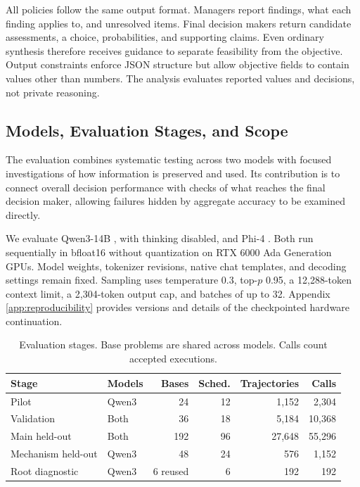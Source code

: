 \documentclass{svproc}
\begin{document}
All policies follow the same output format. Managers report findings, what each
finding applies to, and unresolved items. Final decision makers return candidate
assessments, a choice, probabilities, and supporting claims. Even ordinary
synthesis therefore receives guidance to separate feasibility from the objective.
Output constraints enforce JSON structure but allow objective fields to contain
values other than numbers. The analysis evaluates reported values and decisions,
not private reasoning.



\subsection{Models, Evaluation Stages, and Scope}
The evaluation combines systematic testing across two models with focused
investigations of how information is preserved and used. Its contribution is
to connect overall decision performance with checks of what reaches the final
decision maker, allowing failures hidden by aggregate accuracy to be examined
directly.

We evaluate Qwen3-14B \cite{qwenmodel}, with thinking disabled, and Phi-4
\cite{phimodel}. Both run sequentially in bfloat16 without quantization on
RTX 6000 Ada Generation GPUs. Model weights, tokenizer revisions, native chat
templates, and decoding settings remain fixed. Sampling uses temperature 0.3,
top-$p$ 0.95, a 12,288-token context limit, a 2,304-token output cap, and batches
of up to 32. Appendix \ref{app:reproducibility} provides versions and details
of the checkpointed hardware continuation.

\begin{table}[htbp]
\centering\small
\setlength{\tabcolsep}{4pt}
\caption{Evaluation stages. Base problems are shared across models. Calls count accepted executions.}\label{tab:stages}
\begin{tabular}{llrrrr}\toprule
Stage & Models & Bases & Sched. & Trajectories & Calls\\\midrule
Pilot & Qwen3 & 24 & 12 & 1,152 & 2,304\\
Validation & Both & 36 & 18 & 5,184 & 10,368\\
Main held-out & Both & 192 & 96 & 27,648 & 55,296\\
Mechanism held-out & Qwen3 & 48 & 24 & 576 & 1,152\\
Root diagnostic & Qwen3 & 6 reused & 6 & 192 & 192\\
\bottomrule\end{tabular}
\end{table}
\end{document}
